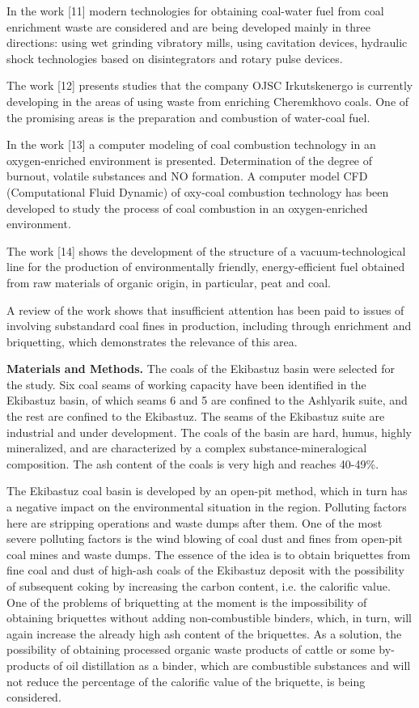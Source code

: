 In the work {[}11{]} modern technologies for obtaining coal-water fuel
from coal enrichment waste are considered and are being developed mainly
in three directions: using wet grinding vibratory mills, using
cavitation devices, hydraulic shock technologies based on disintegrators
and rotary pulse devices.

The work {[}12{]} presents studies that the company OJSC Irkutskenergo
is currently developing in the areas of using waste from enriching
Cheremkhovo coals. One of the promising areas is the preparation and
combustion of water-coal fuel.

In the work {[}13{]} a computer modeling of coal combustion technology
in an oxygen-enriched environment is presented. Determination of the
degree of burnout, volatile substances and NO formation. A computer
model CFD (Computational Fluid Dynamic) of oxy-coal combustion
technology has been developed to study the process of coal combustion in
an oxygen-enriched environment.

The work {[}14{]} shows the development of the structure of a
vacuum-technological line for the production of environmentally
friendly, energy-efficient fuel obtained from raw materials of organic
origin, in particular, peat and coal.

A review of the work shows that insufficient attention has been paid to
issues of involving substandard coal fines in production, including
through enrichment and briquetting, which demonstrates the relevance of
this area.

{\bfseries Materials and Methods.} The coals of the Ekibastuz basin were
selected for the study. Six coal seams of working capacity have been
identified in the Ekibastuz basin, of which seams 6 and 5 are confined
to the Ashlyarik suite, and the rest are confined to the Ekibastuz. The
seams of the Ekibastuz suite are industrial and under development. The
coals of the basin are hard, humus, highly mineralized, and are
characterized by a complex substance-mineralogical composition. The ash
content of the coals is very high and reaches 40-49\%.

The Ekibastuz coal basin is developed by an open-pit method, which in
turn has a negative impact on the environmental situation in the region.
Polluting factors here are stripping operations and waste dumps after
them. One of the most severe polluting factors is the wind blowing of
coal dust and fines from open-pit coal mines and waste dumps. The
essence of the idea is to obtain briquettes from fine coal and dust of
high-ash coals of the Ekibastuz deposit with the possibility of
subsequent coking by increasing the carbon content, i.e. the calorific
value. One of the problems of briquetting at the moment is the
impossibility of obtaining briquettes without adding non-combustible
binders, which, in turn, will again increase the already high ash
content of the briquettes. As a solution, the possibility of obtaining
processed organic waste products of cattle or some by-products of oil
distillation as a binder, which are combustible substances and will not
reduce the percentage of the calorific value of the briquette, is being
considered.

